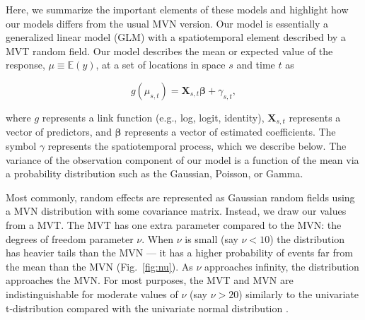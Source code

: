 \documentclass[12pt,english]{article}
\begin{document}
\begin{spacing}{1.5}
Here, we summarize the important elements of these models and
highlight how our models differs from the usual MVN version. Our model is
essentially a generalized linear model (GLM) with a spatiotemporal element
described by a MVT random field. Our model describes the mean or expected value
of the response, $\mu \equiv \mathbb{E}(y)$, at a set of locations in space $s$
and time $t$ as

\begin{equation}
  g(\mu_{s,t}) = \bm{X}_{s,t} \bm{\beta} + \gamma_{s,t},
\end{equation}

\noindent where $g$ represents a link function (e.g., log, logit, identity),
$\bm{X}_{s,t}$ represents a vector of predictors, and $\bm{\beta}$ represents a
vector of estimated coefficients.
The symbol $\gamma$ represents the spatiotemporal process,
which we describe below.
The variance of the observation component of
our model is a function of the mean via a
probability distribution such as the Gaussian, Poisson, or Gamma.

Most commonly, random effects are represented as Gaussian random fields using a
MVN distribution with some covariance matrix. Instead, we draw our values from
a MVT. The MVT has one extra parameter compared to the MVN: the degrees of
freedom parameter $\nu$. When $\nu$ is small (say $\nu < 10$) the distribution
has heavier tails than the MVN --- it has a higher probability of events far
from the mean than the MVN (Fig.~\ref{fig:nu}). As $\nu$ approaches infinity,
the distribution approaches the MVN. For most purposes, the MVT and MVN are
indistinguishable for moderate values of $\nu$ (say $\nu > 20$) similarly to
the univariate t-distribution compared with the univariate normal distribution
\citep[e.g.,][]{anderson2017}.


\end{spacing}
\end{document}
